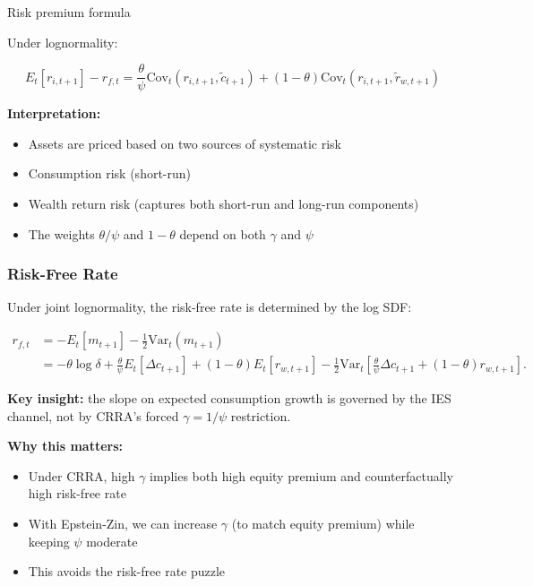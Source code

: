 \documentclass{beamer}
\begin{document}
\begin{frame}{Risk premium formula}
    
    Under lognormality:
    \begin{tcolorbox}[colback=red!5!white, colframe=red!75!black]
        \begin{equation*}
        E_t[r_{i,t+1}] - r_{f,t} = \frac{\theta}{\psi} \text{Cov}_t(r_{i,t+1}, \tilde{c}_{t+1}) + (1-\theta) \text{Cov}_t(r_{i,t+1}, \tilde{r}_{w,t+1})
    \end{equation*}
    \end{tcolorbox}
    
 
    \textbf{Interpretation:}
    \begin{itemize}
        \item Assets are priced based on two sources of systematic risk
        \item Consumption risk (short-run)
        \item Wealth return risk (captures both short-run and long-run components)
        \item The weights $\theta/\psi$ and $1-\theta$ depend on both $\gamma$ and $\psi$
    \end{itemize}
\end{frame}


\begin{frame}[shrink=8]
    \frametitle{Risk-Free Rate}
    \footnotesize
    
    Under joint lognormality, the risk-free rate is determined by the log SDF:
    \begin{tcolorbox}[colback=blue!5!white, colframe=blue!75!black]
    \begin{align*}
        r_{f,t}
        &= -E_t[m_{t+1}]-\frac{1}{2}\mathrm{Var}_t(m_{t+1})\\
        &= -\theta\log\delta
        +\frac{\theta}{\psi}E_t[\Delta c_{t+1}]
        +(1-\theta)E_t[r_{w,t+1}]
        -\frac{1}{2}\mathrm{Var}_t\!\left[
        \frac{\theta}{\psi}\Delta c_{t+1}
        +(1-\theta)r_{w,t+1}
        \right].
    \end{align*}
    \end{tcolorbox}
    
    \textbf{Key insight:} the slope on expected consumption growth is governed by the IES channel, not by CRRA's forced $\gamma=1/\psi$ restriction.
    
    \textbf{Why this matters:}
    \begin{itemize}
        \item Under CRRA, high $\gamma$ implies both high equity premium and counterfactually high risk-free rate
        
        \item With Epstein-Zin, we can increase $\gamma$ (to match equity premium) while keeping $\psi$ moderate
        
        \item This avoids the risk-free rate puzzle
    \end{itemize}
\end{frame}
\end{document}
